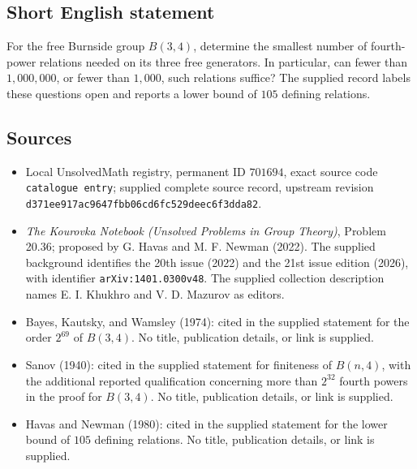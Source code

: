 \documentclass[11pt]{article}
\begin{document}
\subsection{Short English statement}
For the free Burnside group \(B(3,4)\), determine the smallest number of fourth-power relations needed on its three free generators. In particular, can fewer than \(1{,}000{,}000\), or fewer than \(1{,}000\), such relations suffice? The supplied record labels these questions open and reports a lower bound of \(105\) defining relations.
\subsection{Sources}
\begin{itemize}
\item Local UnsolvedMath registry, permanent ID \(701694\), exact source code \texttt{catalogue entry}; supplied complete source record, upstream revision \texttt{d371ee917ac9647fbb06cd6fc529deec6f3dda82}.
\item \emph{The Kourovka Notebook (Unsolved Problems in Group Theory)}, Problem 20.36; proposed by G. Havas and M. F. Newman (2022). The supplied background identifies the 20th issue (2022) and the 21st issue edition (2026), with identifier \texttt{arXiv:1401.0300v48}. The supplied collection description names E. I. Khukhro and V. D. Mazurov as editors.
\item Bayes, Kautsky, and Wamsley (1974): cited in the supplied statement for the order \(2^{69}\) of \(B(3,4)\). No title, publication details, or link is supplied.
\item Sanov (1940): cited in the supplied statement for finiteness of \(B(n,4)\), with the additional reported qualification concerning more than \(2^{32}\) fourth powers in the proof for \(B(3,4)\). No title, publication details, or link is supplied.
\item Havas and Newman (1980): cited in the supplied statement for the lower bound of \(105\) defining relations. No title, publication details, or link is supplied.
\end{itemize}
\end{document}
